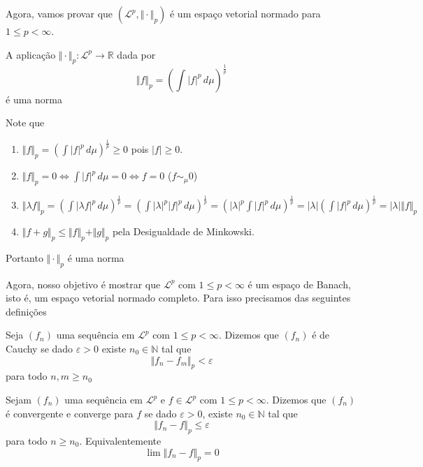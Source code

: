 \documentclass[a4paper, 11pt]{book}
\theoremstyle{definition}
\newcommand{\bN}{\mathbb{N}}
\newcommand{\bR}{\mathbb{R}}
\newcommand{\cL}{\mathcal{L}}
\begin{document}
Agora, vamos provar que $(\cL^p, \Vert \cdot \Vert_p)$ é um espaço vetorial normado para $1 \leqslant p < \infty$.
\begin{pbox}
    A aplicação $\Vert \cdot \Vert_p : \cL^p \to \bR$ dada por
    \[
        \Vert f \Vert_p = \left( \int |f|^p \, d\mu \right)^{\frac{1}{p}}
    \]
    é uma norma
\end{pbox}
\begin{prf}
    Note que
    \begin{enumerate}
        \item $\displaystyle  \Vert f \Vert_p = \left(\int |f|^p \, d\mu \right)^{\frac{1}{p}} \geqslant 0$ pois $|f| \geqslant 0$.
        \item $\displaystyle \Vert f \Vert_p = 0 \iff \int |f|^p \, d\mu = 0 \iff f = 0$ ($f \sim_\mu 0$)
        \item $\displaystyle \Vert \lambda f \Vert_p = \left( \int |\lambda f|^p \,d\mu \right)^{\frac{1}{p}} \!\! = \left( \int |\lambda|^p |f|^p \,d\mu \right)^{\frac{1}{p}} \!\! = \left(|\lambda|^p \int |f|^p \,d\mu \right)^{\frac{1}{p}} \!\! = |\lambda| \left( \int |f|^p \,d\mu \right)^{\frac{1}{p}} \!\! = |\lambda| \Vert f \Vert_p$
        \item $\Vert f + g \Vert_p \leqslant \Vert f \Vert_p + \Vert g \Vert_p$ pela Desigualdade de Minkowski.
    \end{enumerate}
    Portanto $\Vert \cdot \Vert_p$ é uma norma
\end{prf}

Agora, nosso objetivo é mostrar que $\cL^p$ com $1 \leqslant p < \infty$ é um espaço de Banach, isto é, um espaço vetorial normado completo.
Para isso precisamos das seguintes definições

\begin{dbox}
    Seja $(f_n)$ uma sequência em $\cL^p$ com $1 \leqslant p < \infty$. Dizemos que $(f_n)$ é de Cauchy se dado $\varepsilon > 0$ existe $n_0 \in \bN$ tal que
    \[
        \Vert f_n - f_m \Vert_p < \varepsilon
    \]
    para todo $n,m \geqslant n_0$
\end{dbox}

\begin{dbox}
    Sejam $(f_n)$ uma sequência em $\cL^p$ e $f \in \cL^p$ com $1 \leqslant p < \infty$. Dizemos que $(f_n)$ é convergente e converge para $f$ se dado $\varepsilon > 0$, existe $n_0 \in \bN$ tal que
    \[
        \Vert f_n - f \Vert_p \leqslant \varepsilon
    \]
    para todo $n \geqslant n_0$. Equivalentemente
    \[
        \lim \Vert f_n - f \Vert_p = 0
    \]
\end{dbox}
\end{document}
